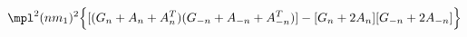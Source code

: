 \begin{equation}
\mpl^2 ( n m_1 )^2 \Big\{[( G_n + A_n + A_n^T ) ( G_{- n} +
A_{- n} + A_{- n}^T )] - [G_n + 2 A_n] [G_{- n} + 2 A_{- n}] \Big\}
\end{equation} 

